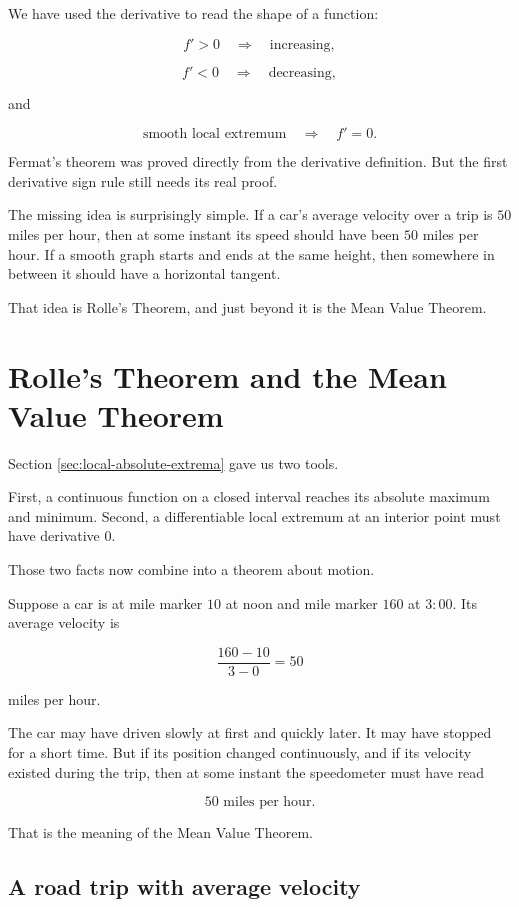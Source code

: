 We have used the derivative to read the shape of a function:

\[
f'>0 \quad\Rightarrow\quad \text{increasing},
\]

\[
f'<0 \quad\Rightarrow\quad \text{decreasing},
\]

and

\[
\text{smooth local extremum} \quad\Rightarrow\quad f'=0.
\]

Fermat's theorem was proved directly from the derivative definition.  But the first
derivative sign rule still needs its real proof.

The missing idea is surprisingly simple.  If a car's average velocity over a trip is
\(50\) miles per hour, then at some instant its speed should have been \(50\) miles
per hour.  If a smooth graph starts and ends at the same height, then somewhere in
between it should have a horizontal tangent.

That idea is Rolle's Theorem, and just beyond it is the Mean Value Theorem.
\section{Rolle's Theorem and the Mean Value Theorem}
\label{sec:rolle-mvt}

Section \ref{sec:local-absolute-extrema} gave us two tools.

First, a continuous function on a closed interval reaches its absolute maximum and
minimum.  Second, a differentiable local extremum at an interior point must have
derivative \(0\).

Those two facts now combine into a theorem about motion.

Suppose a car is at mile marker \(10\) at noon and mile marker \(160\) at
\(3{:}00\).  Its average velocity is

\[
\frac{160-10}{3-0}=50
\]

miles per hour.

The car may have driven slowly at first and quickly later.  It may have stopped for
a short time.  But if its position changed continuously, and if its velocity existed
during the trip, then at some instant the speedometer must have read

\[
50\text{ miles per hour}.
\]

That is the meaning of the Mean Value Theorem.

\subsection{A road trip with average velocity}
\label{subsec:road-trip-average-velocity}

